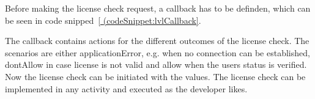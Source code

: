 Before making the license check request, a callback has to be definden, which can be seen in code snipped~\ref{ (codeSnippet:lvlCallback}.

The callback contains actions for the different outcomes of the license check.
The scenarios are either applicationError, e.g. when no connection can be established, dontAllow in case license is not valid and allow when the users status is verified.
Now the license check can be initiated with the values. \cite{developersLicensingSetup} \cite{developersLicensingAdding}
\newline
The license check can be implemented in any activity and executed as the developer likes.
